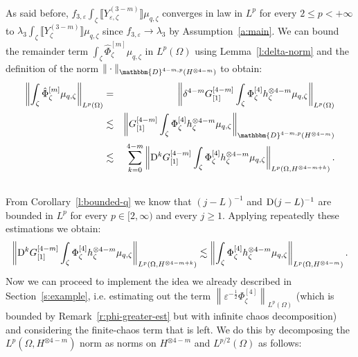As said before, $f_{3, \varepsilon} \int_{\zeta} \llbracket Y^{(3 -
m)}_{\varepsilon, \zeta} \rrbracket \mu_{q, \zeta}$ converges in law in $L^p$
for every $2 \leqslant p < + \infty$ to $\lambda_3^{} \int_{\zeta} \llbracket
Y^{(3 - m)}_{\zeta} \rrbracket \mu_{q, \zeta}$ since $f_{3, \varepsilon}
\rightarrow \lambda_3$ by Assumption~\ref{a:main}. We can bound the remainder
term $\int_{\zeta} \hat{\Phi}^{[m]}_{\zeta} \mu_{q, \zeta}$ in $L^p (\Omega)$
using Lemma~\ref{l:delta-norm} and the definition of the norm $\| \cdummy
\|_{\mathbbm{D}^{4 - m, p} (H^{\otimes 4 - m})}$ to obtain:
\begin{eqnarray*}
  \left\| \int_{\zeta} \hat{\Phi}^{[m]}_{\zeta} \mu_{q, \zeta} \right\|_{L^p
  (\Omega)} & = & \left\| \delta^{4 - m} G^{[4 - m]}_{[1]} \int_{\zeta}
  \Phi^{[4]}_{\zeta} h^{\otimes 4 - m}_{\zeta} \mu_{q, \zeta} \right\|_{L^p
  (\Omega)}\\
  & \lesssim & \left\| G^{[4 - m]}_{[1]} \int_{\zeta} \Phi^{[4]}_{\zeta}
  h^{\otimes 4 - m}_{\zeta} \mu_{q, \zeta} \right\|_{\mathbbm{D}^{4 - m, p}
  (H^{\otimes 4 - m})}\\
  & \lesssim & \sum_{k = 0}^{4 - m} \left\| \mathD^k G^{[4 - m]}_{[1]}
  \int_{\zeta} \Phi^{[4]}_{\zeta} h^{\otimes 4 - m}_{\zeta} \mu_{q, \zeta}
  \right\|_{L^p (\Omega, H^{\otimes 4 - m + k})} .\\
  &  & 
\end{eqnarray*}
From Corollary~\ref{l:bounded-q} we know that $(j - L)^{- 1}$ and $\mathrm{D} (j -
L)^{- 1}$ are bounded in $L^p$ for every $p \in [2, \infty)$ and every $j
\geqslant 1$. Applying repeatedly these estimations we obtain:
\[ \left\| \mathrm{D}^k G^{[4 - m]}_{[1]} \int_{\zeta} \Phi^{[4]}_{\zeta}
   h^{\otimes 4 - m}_{\zeta} \mu_{q, \zeta} \right\|_{L^p (\Omega, H^{\otimes
   4 - m + k})} \lesssim \left\| \int_{\zeta} \Phi^{[4]}_{\zeta} h^{\otimes 4
   - m}_{\zeta} \mu_{q, \zeta} \right\|_{L^p (\Omega, H^{\otimes 4 - m})} . \]
Now we can proceed to implement the idea we already described in
Section~\ref{s:example}, i.e. estimating out the term $\left\| \varepsilon^{-
\frac{1}{2}} \Phi^{[4]}_{\zeta} \right\|_{L^p (\Omega)}$ (which is bounded by
Remark~\ref{r:phi-greater-est} but with infinite chaos decomposition) and
considering the finite-chaos term that is left. We do this by decomposing the
$L^p (\Omega, H^{\otimes 4 - m})$ norm as norms on $H^{\otimes 4 - m}$ and
$L^{p / 2} (\Omega)$ as follows: \
